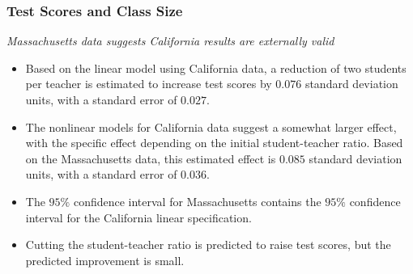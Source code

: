 \begin{frame}
\frametitle{Test Scores and Class Size}
\emph{Massachusetts data suggests California results are externally valid}
\begin{itemize}
\item Based on the linear model using California data, a reduction of two students per teacher is estimated to increase test scores by $0.076$ standard deviation units, with a standard error of $0.027$. 
\item The nonlinear models for California data suggest a somewhat larger effect, with the specific effect depending on the initial student-teacher ratio. Based on the Massachusetts data, this estimated effect is $0.085$ standard deviation units, with a standard error of $0.036$.
\item The $95\%$ confidence interval for Massachusetts contains the $95\%$ confidence interval for the California linear specification. 
\item Cutting the student-teacher ratio is predicted to raise test scores, but the predicted improvement is small.
\end{itemize}
\end{frame}


